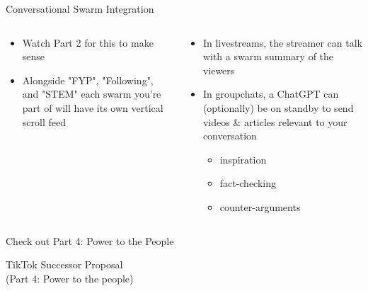 \documentclass[aspectratio=169]{beamer}
\begin{document}
\begin{frame}{Conversational Swarm Integration}
\begin{columns}[T]
    \begin{column}[T]{0.5\textwidth}
        \begin{itemize}
            \item Watch Part 2 for this to make sense
            \item Alongside "FYP", "Following", and "STEM" each swarm you're part of will have its own vertical scroll feed
        \end{itemize}
    \end{column}
    \begin{column}{0.5\textwidth}
        \begin{itemize}
            \item In livestreams, the streamer can talk with a swarm summary of the viewers
            \item In groupchats, a ChatGPT can (optionally) be on standby to send videos \& articles relevant to your conversation
            \begin{itemize}
                \item inspiration
                \item fact-checking
                \item counter-arguments
            \end{itemize}
        \end{itemize}
    \end{column}
\end{columns}
\end{frame}

\begin{frame}{Check out Part 4: Power to the People}
\end{frame}

\begin{frame}
    \centering
    \Huge TikTok Successor Proposal \\
    \Huge (Part 4: Power to the people)
\end{frame}
\end{document}
